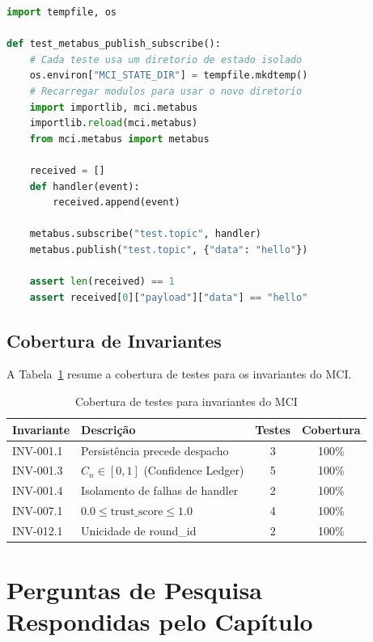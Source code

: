 \begin{lstlisting}[language=Python, caption={Isolamento de estado em testes via MCI\_STATE\_DIR}, label={lst:test-isolation}]
import tempfile, os

def test_metabus_publish_subscribe():
    # Cada teste usa um diretorio de estado isolado
    os.environ["MCI_STATE_DIR"] = tempfile.mkdtemp()
    # Recarregar modulos para usar o novo diretorio
    import importlib, mci.metabus
    importlib.reload(mci.metabus)
    from mci.metabus import metabus
    
    received = []
    def handler(event):
        received.append(event)
    
    metabus.subscribe("test.topic", handler)
    metabus.publish("test.topic", {"data": "hello"})
    
    assert len(received) == 1
    assert received[0]["payload"]["data"] == "hello"
\end{lstlisting}

\subsection{Cobertura de Invariantes}

A Tabela~\ref{tab:invariant-coverage} resume a cobertura de testes para os invariantes do MCI.

\begin{table}[htbp]
\centering
\caption{Cobertura de testes para invariantes do MCI}
\label{tab:invariant-coverage}
\begin{tabular}{@{}p{3cm}p{7cm}cc@{}}
\toprule
\textbf{Invariante} & \textbf{Descrição} & \textbf{Testes} & \textbf{Cobertura} \\
\midrule
INV-001.1 & Persistência precede despacho & 3 & 100\% \\
INV-001.3 & $C_n \in [0, 1]$ (Confidence Ledger) & 5 & 100\% \\
INV-001.4 & Isolamento de falhas de handler & 2 & 100\% \\
INV-007.1 & $0.0 \leq \text{trust\_score} \leq 1.0$ & 4 & 100\% \\
INV-012.1 & Unicidade de round\_id & 2 & 100\% \\
\bottomrule
\end{tabular}
\end{table}

\section{Perguntas de Pesquisa Respondidas pelo Capítulo}
\label{sec:research-questions}


